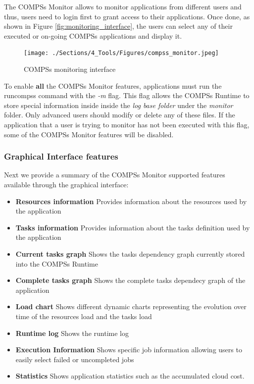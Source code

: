 The COMPSs Monitor allows to monitor applications from different users and thus, users need to login first to grant access 
to their applications. Once done, as shown in Figure \ref{fig:monitoring_interface}, the users can select any of their executed
or on-going COMPSs applications and display it.
\begin{figure}[thb!]
  \centering
    \texttt{[image: ./Sections/4\_Tools/Figures/compss\_monitor.jpeg]}
    \caption{COMPSs monitoring interface}
\end{figure}
\label{fig:monitoring_interface}

To enable \textbf{all} the COMPSs Monitor features, applications must run the runcompss command with the \textit{-m} flag. This flag 
allows the  COMPSs Runtime to store special information inside inside the \textit{log base folder} under the \textit{monitor} 
folder. Only advanced users should modify or delete any of these files. If the application that a user is trying to monitor 
has not been executed with this flag, some of the COMPSs Monitor features will be disabled. 

\subsubsection{Graphical Interface features}
Next we provide a summary of the COMPSs Monitor supported features available through the graphical interface:
\begin{itemize}
 \item \textbf{Resources information} \newline
	Provides information about the resources used by the application
 \item \textbf{Tasks information} \newline
	Provides information about the tasks definition used by the application
 \item \textbf{Current tasks graph} \newline
	Shows the tasks dependency graph currently stored into the COMPSs Runtime
 \item \textbf{Complete tasks graph} \newline
	Shows the complete tasks dependecy graph of the application
 \item \textbf{Load chart} \newline
	Shows different dynamic charts representing the evolution over time of the resources load and the tasks load
 \item \textbf{Runtime log} \newline
	Shows the runtime log
 \item \textbf{Execution Information} \newline
	Shows specific job information allowing users to easily select failed or uncompleted jobs
 \item \textbf{Statistics} \newline
	Shows application statistics such as the accumulated cloud cost. 
\end{itemize}

